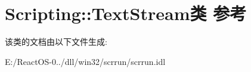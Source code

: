\hypertarget{class_scripting_1_1_text_stream}{}\section{Scripting\+:\+:Text\+Stream类 参考}
\label{class_scripting_1_1_text_stream}


该类的文档由以下文件生成\+:\begin{DoxyCompactItemize}
\item 
E\+:/\+React\+O\+S-\/0../dll/win32/scrrun/scrrun.\+idl\end{DoxyCompactItemize}
